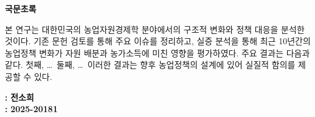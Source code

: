 
\begin{center}
    {\LARGE \bfseries 국문초록}
\end{center}


\vspace{1cm}

본 연구는 대한민국의 농업자원경제학 분야에서의 구조적 변화와 정책 대응을 분석한 것이다.
기존 문헌 검토를 통해 주요 이슈를 정리하고, 실증 분석을 통해 최근 10년간의 농업정책 변화가 
자원 배분과 농가소득에 미친 영향을 평가하였다. 주요 결과는 다음과 같다. 첫째, \ldots\ 
둘째, \ldots\ 이러한 결과는 향후 농업정책의 설계에 있어 실질적 함의를 제공할 수 있다.


\noindent
{}
\textbf{:}
\textbf{전소희}\\
\textbf{:}
\textbf{2025-20181}\\
